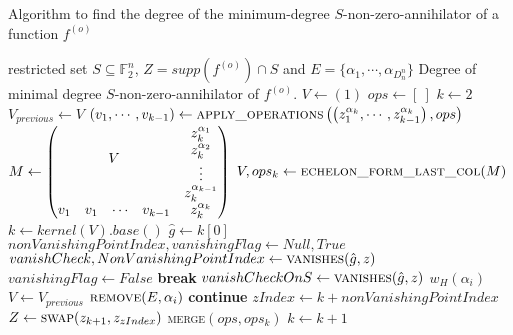 \documentclass[11pt]{llncs}
\begin{document}
\begin{algorithm}
	\caption{Algorithm to find the degree of the minimum-degree $S$-non-zero-annihilator of a function $f^{(o)}$}\label{alg:MinDegreeSnonZeroAnnihilatorIterative}
	\begin{algorithmic}[1]
		\Require restricted set $S\subseteq \mathbb{F}_2^n$, $Z = supp\left(f^{(o)}\right) \cap S$ and $E = \{\alpha_1, \cdots, \alpha_{D_n^n}\}$
		\Ensure Degree of minimal degree $S$-non-zero-annihilator of $f^{(o)}$.
		\State
		\State $V\gets (1)$
		\State $ops \gets [\ ]$
		\State $k \gets 2$
		\State $V_{previous} \gets V$
		\State $\left(v_1, \cdots, v_{k-1}\right) \gets \mbox{\textsc{apply\_operations}}\left(\left(z_1^{\alpha_k}, \cdots, z_{k-1}^{\alpha_k}\right), ops\right)$
		\State  $M \gets \begin{pmatrix}
		\multicolumn{4}{c}{\multirow{4}{*}{$V$}} & z_k^{\alpha_1}\\
		& & & & z_k^{\alpha_2}\\
		& & & & \vdots\\
		& & & & z_k^{\alpha_{k-1}}\\
		v_1 & v_1& \cdots & v_{k-1} & z_k^{\alpha_k}
		\end{pmatrix}$
		\State $V, ops_k\gets \mbox{\textsc{echelon\_form\_last\_col}}(M)$
		\State $k \gets kernel\left(V\right).base()$
		\State $\hat{g} \gets k[0]$
		\State $nonVanishingPointIndex, vanishingFlag \gets Null, True$
		\State $vanishCheck, NonVanishingPointIndex \gets \mbox{\textsc{vanishes}}(\hat{g}, z)$
		\State $vanishingFlag \gets False$
		\State \textbf{break}
		\EndIf
		\State $vanishCheckOnS \gets \mbox{\textsc{vanishes}}(\hat{g}, z)$
		\State \Return $w_H\left(\alpha_i\right)$
		\EndIf
		\EndFor
		\State $V\gets V_{previous}$
		\State $\mbox{\textsc{remove}}(E, \alpha_i)$
		\State \textbf{continue}
		\EndFor
		\State $zIndex \gets k+nonVanishingPointIndex$
		\State $Z \gets \mbox{\textsc{swap}}(z_{k+1}, z_{zIndex})$
		\State \textsc{merge}$(ops, ops_k)$
		\State $k\gets k+1$
		\EndIf
		\EndWhile
	\end{algorithmic}
\end{algorithm}
\newpage
\end{document}
